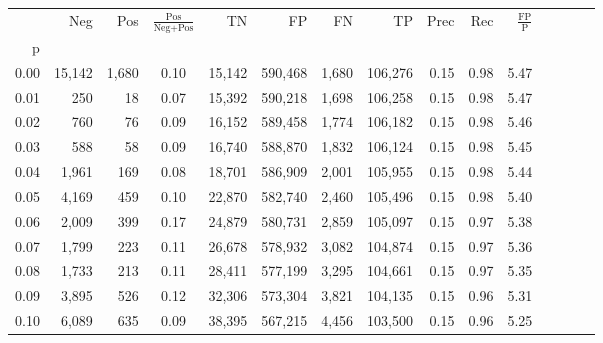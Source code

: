 \begin{tabular}{rrrcrrrrrrrrrrr}
\toprule
{} &     Neg &    Pos & $\frac{\text{Pos}}{\text{Neg}+\text{Pos}}$ &       TN &       FP &       FN &       TP &  Prec &   Rec & $\frac{\text{FP}}{\text{P}}$ \\
p    &         &        &                                            &          &          &          &          &       &       &                              \\
\midrule
0.00 &  15,142 &  1,680 &                                       0.10 &   15,142 &  590,468 &    1,680 &  106,276 &  0.15 &  0.98 &                         5.47 \\
0.01 &     250 &     18 &                                       0.07 &   15,392 &  590,218 &    1,698 &  106,258 &  0.15 &  0.98 &                         5.47 \\
0.02 &     760 &     76 &                                       0.09 &   16,152 &  589,458 &    1,774 &  106,182 &  0.15 &  0.98 &                         5.46 \\
0.03 &     588 &     58 &                                       0.09 &   16,740 &  588,870 &    1,832 &  106,124 &  0.15 &  0.98 &                         5.45 \\
0.04 &   1,961 &    169 &                                       0.08 &   18,701 &  586,909 &    2,001 &  105,955 &  0.15 &  0.98 &                         5.44 \\
0.05 &   4,169 &    459 &                                       0.10 &   22,870 &  582,740 &    2,460 &  105,496 &  0.15 &  0.98 &                         5.40 \\
0.06 &   2,009 &    399 &                                       0.17 &   24,879 &  580,731 &    2,859 &  105,097 &  0.15 &  0.97 &                         5.38 \\
0.07 &   1,799 &    223 &                                       0.11 &   26,678 &  578,932 &    3,082 &  104,874 &  0.15 &  0.97 &                         5.36 \\
0.08 &   1,733 &    213 &                                       0.11 &   28,411 &  577,199 &    3,295 &  104,661 &  0.15 &  0.97 &                         5.35 \\
0.09 &   3,895 &    526 &                                       0.12 &   32,306 &  573,304 &    3,821 &  104,135 &  0.15 &  0.96 &                         5.31 \\
0.10 &   6,089 &    635 &                                       0.09 &   38,395 &  567,215 &    4,456 &  103,500 &  0.15 &  0.96 &                         5.25 \\

\end{tabular}
